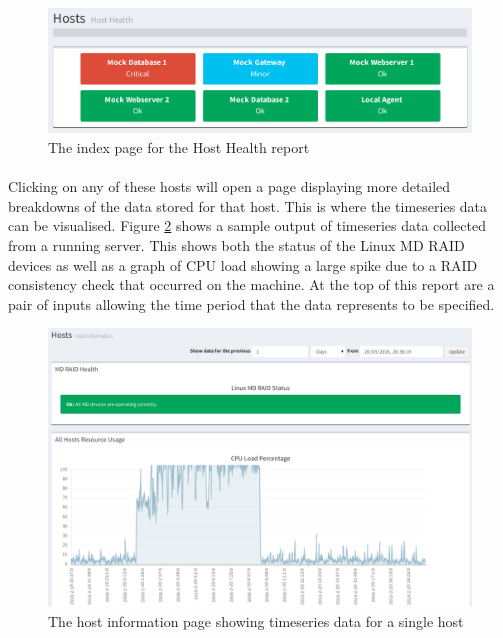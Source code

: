 \documentclass[bsc,logo,twoside,singlespacing,notimes]{infthesis}
\begin{document}
\begin{figure}[H]
	\centering
	\caption{The index page for the Host Health report}
	\label{host-health-index}
	\includegraphics[scale=0.7]{assets/screenshots/host-health-index.pdf}
\end{figure}

\paragraph*{}
	Clicking on any of these hosts will open a page displaying more detailed
	breakdowns of the data stored for that host.  This is where the timeseries
	data can be visualised.  Figure \ref{host-information} shows a sample
	output of timeseries data collected from a running server.  This shows both
	the status of the Linux MD RAID devices as well as a graph of CPU load
	showing a large spike due to a RAID consistency check that occurred on the
	machine.  At the top of this report are a pair of inputs allowing the time
	period that the data represents to be specified.

\begin{figure}[H]
	\centering
	\caption{The host information page showing timeseries data for a single host}
	\label{host-information}
	\includegraphics[scale=0.43]{assets/screenshots/host-information.pdf}
\end{figure}
\end{document}
